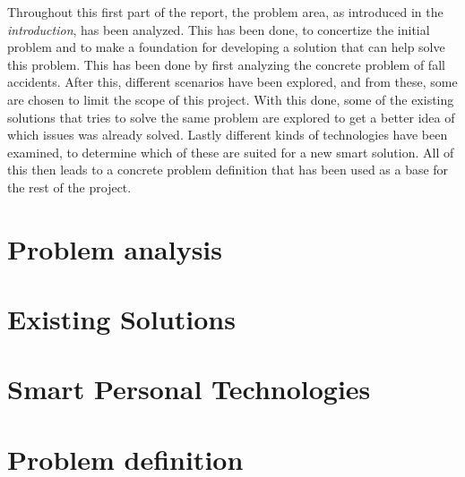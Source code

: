Throughout this first part of the report, the problem area, as introduced in the \textit{introduction}, has been analyzed. This has been done, to concertize the initial problem and to make a foundation for developing a solution that can help solve this problem. This has been done by first analyzing the concrete problem of fall accidents. After this, different scenarios have been explored, and from these, some are chosen to limit the scope of this project. With this done, some of the existing solutions that tries to solve the same problem are explored to get a better idea of which issues was already solved. Lastly different kinds of technologies have been examined, to determine which of these are suited for a new smart solution. All of this then leads to a concrete problem definition that has been used as a base for the rest of the project.

\chapter{Problem analysis}
 

\chapter{Existing Solutions}
\label{preliminaries:existingsolutions}

\chapter{Smart Personal Technologies}


\chapter{Problem definition}

